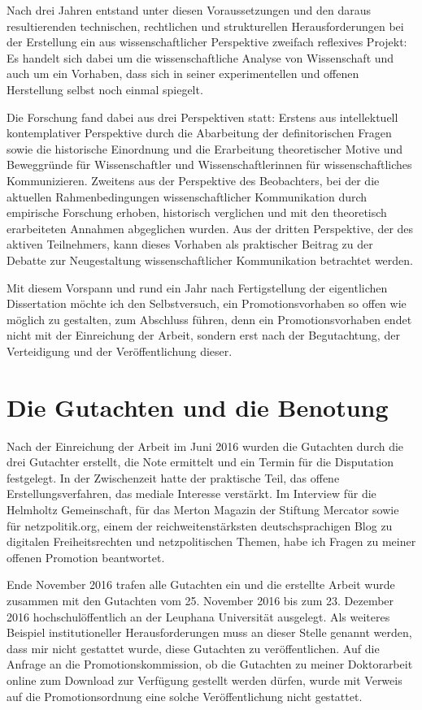 Nach drei Jahren entstand unter diesen Voraussetzungen und den daraus resultierenden technischen, rechtlichen und strukturellen Herausforderungen bei der Erstellung ein aus wissenschaftlicher Perspektive zweifach reflexives Projekt: Es handelt sich dabei um die wissenschaftliche Analyse von Wissenschaft und auch um ein Vorhaben, dass sich in seiner experimentellen und offenen Herstellung selbst noch einmal spiegelt.

Die Forschung fand dabei aus drei Perspektiven statt: Erstens aus intellektuell kontemplativer Perspektive durch die Abarbeitung der definitorischen Fragen sowie die historische Einordnung und die Erarbeitung theoretischer Motive und Beweggründe für Wissenschaftler und Wissenschaftlerinnen für wissenschaftliches Kommunizieren. Zweitens aus der Perspektive des Beobachters, bei der die aktuellen Rahmenbedingungen wissenschaftlicher Kommunikation durch empirische Forschung erhoben, historisch verglichen und mit den theoretisch erarbeiteten Annahmen abgeglichen wurden. Aus der dritten Perspektive, der des aktiven Teilnehmers, kann dieses Vorhaben als praktischer Beitrag zu der Debatte zur Neugestaltung wissenschaftlicher Kommunikation betrachtet werden.

Mit diesem Vorspann und rund ein Jahr nach Fertigstellung der eigentlichen Dissertation möchte ich den Selbstversuch, ein Promotionsvorhaben so offen wie möglich zu gestalten, zum Abschluss führen, denn ein Promotionsvorhaben endet nicht mit der Einreichung der Arbeit, sondern erst nach der Begutachtung, der Verteidigung und der Veröffentlichung dieser.

\section{Die Gutachten und die Benotung}

Nach der Einreichung der Arbeit im Juni 2016 wurden die Gutachten durch die drei Gutachter erstellt, die Note ermittelt und ein Termin für die Disputation festgelegt. In der Zwischenzeit hatte der praktische Teil, das offene Erstellungsverfahren, das mediale Interesse verstärkt. Im Interview für die Helmholtz Gemeinschaft, für das Merton Magazin der Stiftung Mercator sowie für netzpolitik.org, einem der reichweitenstärksten deutschsprachigen Blog zu digitalen Freiheitsrechten und netzpolitischen Themen, habe ich Fragen zu meiner offenen Promotion beantwortet.

Ende November 2016 trafen alle Gutachten ein und die erstellte Arbeit wurde zusammen mit den Gutachten vom 25. November 2016 bis zum 23. Dezember 2016 hochschulöffentlich an der Leuphana Universität ausgelegt. Als weiteres Beispiel institutioneller Herausforderungen muss an dieser Stelle genannt werden, dass mir nicht gestattet wurde, diese Gutachten zu veröffentlichen. Auf die Anfrage an die Promotionskommission, ob die Gutachten zu meiner Doktorarbeit online zum Download zur Verfügung gestellt werden dürfen, wurde mit Verweis auf die Promotionsordnung  eine solche Veröffentlichung nicht gestattet.

